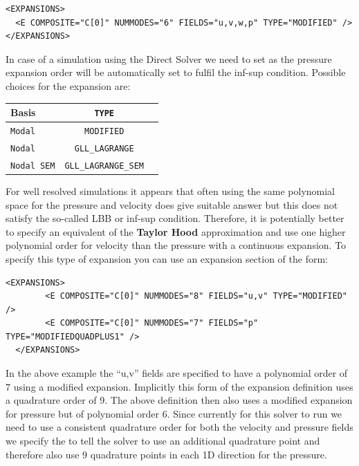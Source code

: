\begin{lstlisting}[style=XMLStyle]
<EXPANSIONS>
  <E COMPOSITE="C[0]" NUMMODES="6" FIELDS="u,v,w,p" TYPE="MODIFIED" />
</EXPANSIONS>
\end{lstlisting}

In case of a simulation using the Direct Solver we need to set
 as the pressure expansion order will be automatically set to
fulfil the inf-sup condition. Possible choices for the expansion 
are:
\begin{center}
\small
\begin{tabular}{lcc}
\toprule
{Basis} & {\texttt{TYPE}} \\
\midrule
\texttt{Modal} & \texttt{MODIFIED} \\
\texttt{Nodal} & \texttt{GLL\_LAGRANGE} \\
\texttt{Nodal SEM} & \texttt{GLL\_LAGRANGE\_SEM} \\
\bottomrule
\end{tabular}
\end{center}

For well resolved simulations it appears that often using the same
polynomial space for the pressure and velocity does give suitable
answer but this does not satisfy the so-called LBB or inf-sup
condition. Therefore, it is potentially better to specify an equivalent
of the \textbf{Taylor Hood} approximation and use one higher polynomial order
for velocity than the pressure with a continuous expansion. To specify
this type of expansion you can use an expansion section of the form:

\begin{lstlisting}[style=XMLStyle]
  <EXPANSIONS>
        <E COMPOSITE="C[0]" NUMMODES="8" FIELDS="u,v" TYPE="MODIFIED" />
        <E COMPOSITE="C[0]" NUMMODES="7" FIELDS="p"   TYPE="MODIFIEDQUADPLUS1" />
  </EXPANSIONS>
\end{lstlisting}

In the above example the ``u,v'' fields are specified to have a
polynomial order of 7 using a modified expansion. Implicitly this form
of the expansion definition uses a quadrature order of 9. The above
definition then also uses a modified expansion for pressure but of polynomial
order 6. Since currently for this solver to run we need to use a
consistent quadrature order for both the velocity and pressure fields
we specify the  to tell the solver to use an
additional quadrature point and therefore also use 9 quadrature points in
each 1D direction for the pressure. 

